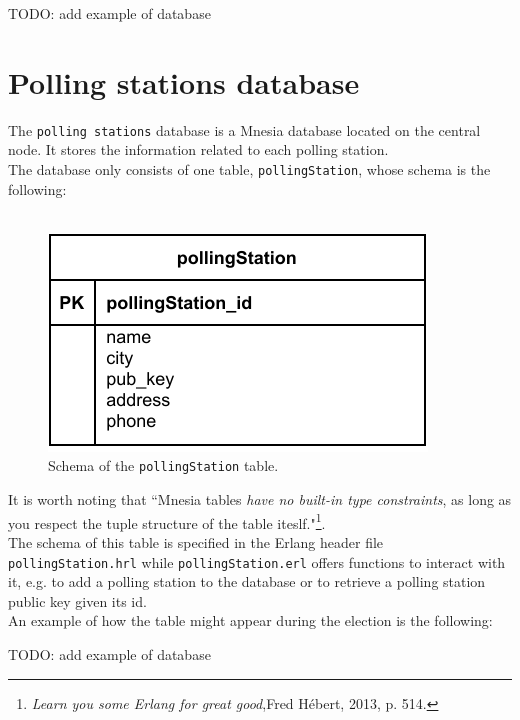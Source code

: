 TODO: add example of database

\section{Polling stations database}\label{sec:polling_stations_db}
The \texttt{polling stations} database is a Mnesia database located on the central node. It stores the information related to each polling station.\\
The database only consists of one table, \texttt{pollingStation}, whose schema is the following:\\
\
\begin{figure}[H]
    \begin{center}
        \includegraphics[scale=1]{img/pollingstation_schema.pdf}
    \end{center}
    \vspace*{-0.5cm}
    \caption{Schema of the \texttt{pollingStation} table.}
    \label{fig:pollingstation_schema}
\end{figure}

It is worth noting that ``Mnesia tables \textit{have no built-in type constraints}, as long as you respect the tuple structure of the table iteslf."\footnote{\textit{Learn you some Erlang for great good},Fred Hébert, 2013, p. 514.}.\\
The schema of this table is specified in the Erlang header file \texttt{pollingStation.hrl} while \texttt{pollingStation.erl} offers functions to interact with it, e.g. to add a polling station to the database or to retrieve a polling station public key given its id.\\
An example of how the table might appear during the election is the following:

TODO: add example of database

